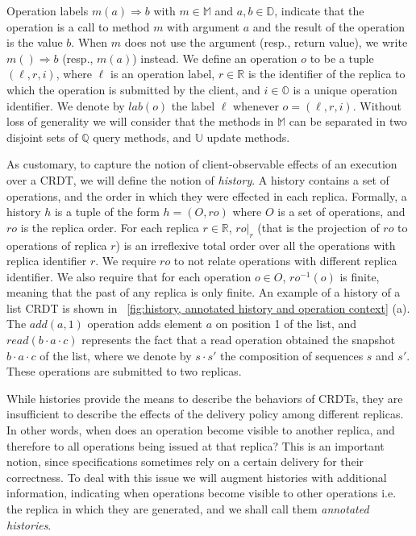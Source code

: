 Operation labels \mbox{$m(a)\Rightarrow b$} with $m \in \mathbb{M}$ and $a,b \in
\mathbb{D}$, indicate that the operation is a call to method $m$
with argument $a$ and the result of the operation is the value
$b$.
When $m$ does not use the argument (resp., return value), we write
$m()\Rightarrow b$ (resp., $m(a)$) instead.
We define an operation $o$ to be a tuple $(\ell,r,i)$, where $\ell$ is
an operation label, $r \in \mathbb{R}$ is the identifier of the
replica to which the operation is submitted by the client, and $i \in \mathbb{O}$ is a
unique operation identifier.
We denote by $\mathit{lab}(o)$ the label $\ell$ whenever $o = (\ell,
r, i)$.
%
Without loss of generality we will consider that the methods in
$\mathbb{M}$ can be separated in two disjoint sets of $\mathbb{Q}$
query methods, and $\mathbb{U}$ update methods.

As customary, to capture the notion of client-observable effects of an
execution over a CRDT, we will define the notion of \emph{history}.
%
A history contains a set of operations, and the order in which
they were effected in each replica.
%
Formally, a history $h$ is a tuple of the form $h = (O,\mathit{ro})$
where $O$ is a set of operations, and $\mathit{ro}$ is the replica
order.
%
For each replica $r \in \mathbb{R}$, $\mathit{ro}|_{r}$ (that is the
projection of $ro$ to operations of replica $r$) is an irreflexive
total order over all the operations with replica identifier $r$.
%
We require $\mathit{ro}$ to not relate operations with different replica identifier.
%
We also require that for each operation $o \in O$,
$\mathit{ro}^{-1}(o)$ is finite, meaning that the past of any replica
is only finite.
An example of a history of a list CRDT is shown in
\figurename~\ref{fig:history, annotated history and operation context} (a).
The $\mathit{add}(a,1)$ operation adds element $a$
on position 1 of the list, and $\mathit{read}(b\cdot a \cdot c)$
represents the fact that a read operation obtained the snapshot
$b\cdot a \cdot c$ of the list, where we denote by $s \cdot s'$ the
composition of sequences $s$ and $s'$. These operations are submitted
to two replicas. 

While histories provide the means to describe the behaviors of CRDTs,
they are insufficient to describe the effects of the delivery
policy among different replicas.
%
In other words, when does an operation become visible to another
replica, and therefore to all operations being issued at that replica?
%
This is an important notion, since specifications sometimes rely on a
certain delivery for their correctness.
%
To deal with this issue we will augment histories with additional
information, indicating when operations become visible to other
operations i.e. the replica in which they are generated, and we
shall call them \emph{annotated histories}.
%

